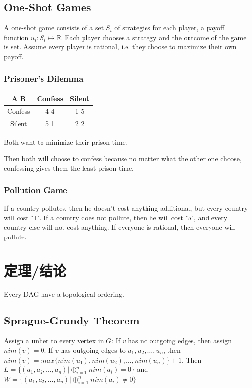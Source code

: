 \documentclass[12pt,a4paper]{ctexrep}
\begin{document}
\subsection{One-Shot Games}
A one-shot game consists of a set $S_i$ of strategies for each player, a payoff function $u_i: S_i \mapsto \mathbb{R}$. Each player chooses a strategy and the outcome of the game is set. Assume every player is rational, i.e. they choose to maximize their own payoff.
\subsubsection{Prisoner's Dilemma}
\begin{center}
\begin{tabular}{|c|c|c|}
\hline
A  B & Confess & Silent\\
\hline
Confess & 4 4 & 1 5 \\
\hline
Silent & 5 1 & 2 2 \\
\hline

\end{tabular}
Both want to minimize their prison time.
\end{center}
Then both will choose to confess because no matter what the other one choose, confessing gives them the least prison time.

\subsubsection{Pollution Game}
If a country pollutes, then he doesn't cost anything additional, but every country will cost "1". If a country does not pollute, then he will cost "5", and every country else will not cost anything. If everyone is rational, then everyone will pollute.

\section{定理/结论}
Every DAG have a topological ordering.

\subsection{Sprague-Grundy Theorem}
Assign a unber to every vertex in $G$: If $v$ has no outgoing edges, then assign $nim(v) = 0$. If $v$ has outgoing edges to $u_1,u_2,\dots,u_n$, then $nim(v) = max\{nim(u_1),nim(u_2),\dots, nim(u_n)\}+1$. Then $L = \{(a_1,a_2,\dots,a_n)|\oplus_{i=1}^n nim(a_i) = 0\}$ and $W = \{(a_1,a_2,\dots,a_n)|\oplus_{i=1}^n nim(a_i) \neq 0\}$
\end{document}
